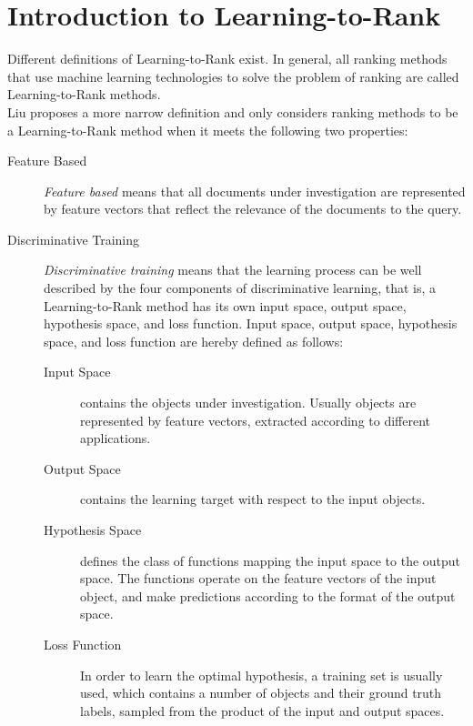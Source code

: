 \chapter{Introduction to Learning-to-Rank}
Different definitions of Learning-to-Rank exist. In general, all ranking methods that use machine learning technologies to solve the problem of ranking are called Learning-to-Rank methods.\\
Liu \cite{Liu2007} proposes a more narrow definition and only considers ranking methods to be a Learning-to-Rank method when it meets the following two properties:
\begin{description}
\item[Feature Based]{\emph{Feature based} means that all documents under investigation are represented by feature vectors that reflect the relevance of the documents to the query.}
\item[Discriminative Training]{\emph{Discriminative training} means that the learning process can be well described by the four components of discriminative learning, that is, a Learning-to-Rank method has its own input space, output space, hypothesis space, and loss function. Input space, output space, hypothesis space, and loss function are hereby defined as follows:
	\begin{description}
	\item[Input Space]{contains the objects under investigation. Usually objects are represented by feature vectors, extracted according to different applications.}
	\item[Output Space]{contains the learning target with respect to the input objects.}
	\item[Hypothesis Space]{defines the class of functions mapping the input space to the output space. The functions operate on the feature vectors of the input object, and make predictions according to the format of the output space.}
	\item[Loss Function]{In order to learn the optimal hypothesis, a training set is usually used, which contains a number of objects and their ground truth labels, sampled from the product of the input and output spaces.}
	\end{description}
	}
\end{description}
